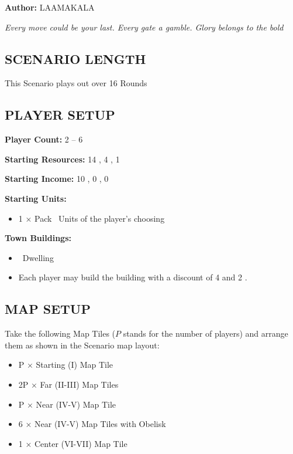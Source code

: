
\begin{multicols*}{2}

\textbf{Author:} LAAMAKALA

\textit{Every move could be your last. Every gate a gamble. Glory belongs to the bold}

\subsection*{\MakeUppercase{Scenario Length}}
This Scenario plays out over 16 Rounds

\subsection*{\MakeUppercase{Player Setup}}
\textbf{Player Count:} 2 -- 6

\textbf{Starting Resources:} 14 , 4 , 1 

\textbf{Starting Income:} 10 , 0 , 0 

\textbf{Starting Units:}

\begin{itemize}
  \item 1 × Pack \bronze\ Units of the player's choosing
\end{itemize}

\textbf{Town Buildings:}
\begin{itemize}
  \item \bronze\ Dwelling
  \item Each player may build the  building with a discount of 4  and 2 .
\end{itemize}

\subsection*{\MakeUppercase{Map Setup}}
Take the following Map Tiles ($P$ stands for the number of players) and arrange them as shown in the Scenario map layout:

\begin{itemize}
  \item P × Starting (I) Map Tile
  \item 2P × Far (II-III) Map Tiles
  \item P × Near (IV-V) Map Tile
  \item 6 × Near (IV-V) Map Tiles with Obelisk
  \item 1 × Center (VI-VII) Map Tile
\end{itemize}


\end{multicols*}
